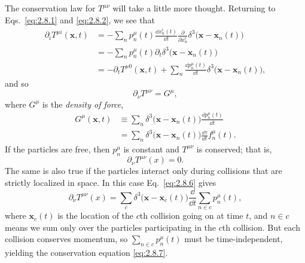 The conservation law for \(T^{\mu\nu}\) will take a little more thought.
Returning to Eqs.~\eqref{eq:2.8.1} and \eqref{eq:2.8.2}, we see that
\[
\begin{aligned}
  \partial_i T^{\mu i}(\mathbf x,t)
  &=-\sum_n p_n^\mu(t)\frac{\dd x_n^i(t)}{\dd t}
    \frac{\partial}{\partial x_n^i}
    \delta^3\bigl(\mathbf x-\mathbf x_n(t)\bigr)\\
  &=-\sum_n p_n^\mu(t)\partial_t
    \delta^3\bigl(\mathbf x-\mathbf x_n(t)\bigr)\\
  &=-\partial_t T^{\mu0}(\mathbf x,t)
    +\sum_n\frac{\dd p_n^\mu(t)}{\dd t}
     \delta^3\bigl(\mathbf x-\mathbf x_n(t)\bigr),
\end{aligned}
\]
and so
\begin{equation}
  \partial_\nu T^{\mu\nu}=G^\mu ,
  \tag{2.8.6}\label{eq:2.8.6}
\end{equation}
where \(G^\mu\) is the \emph{density of force},
\[
\begin{aligned}
  G^\mu(\mathbf x,t)
  &\equiv\sum_n\delta^3\bigl(\mathbf x-\mathbf x_n(t)\bigr)
      \frac{\dd p_n^\mu(t)}{\dd t}\\
  &=\sum_n\delta^3\bigl(\mathbf x-\mathbf x_n(t)\bigr)
      \frac{\dd\tau}{\dd t}f_n^\mu(t).
\end{aligned}
\]
If the particles are free, then \(p_n^\mu\) is constant and \(T^{\mu\nu}\)
is conserved; that is,
\begin{equation}
  \partial_\nu T^{\mu\nu}(x)=0 .
  \tag{2.8.7}\label{eq:2.8.7}
\end{equation}
The same is also true if the particles interact only during collisions that are
strictly localized in space. In this case Eq.~\eqref{eq:2.8.6} gives
\[
  \partial_\nu T^{\mu\nu}(x)
  =\sum_c\delta^3\bigl(\mathbf x-\mathbf x_c(t)\bigr)
    \frac{\dd}{\dd t}\sum_{n\in c}p_n^\mu(t),
\]
where \(\mathbf x_c(t)\) is the location of the \(c\)th collision going on at
time \(t\), and \(n\in c\) means we sum only over the particles participating
in the \(c\)th collision. But each collision conserves momentum, so
\(\sum_{n\in c}p_n^\mu(t)\) must be time-independent, yielding the
conservation equation \eqref{eq:2.8.7}.


